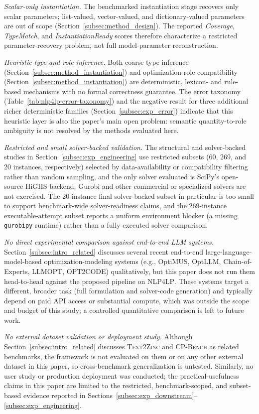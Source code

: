 \documentclass[pdflatex,sn-basic,Numbered]{sn-jnl}
\begin{document}
\emph{Scalar-only instantiation.} The benchmarked instantiation stage recovers only scalar parameters; list-valued, vector-valued, and dictionary-valued parameters are out of scope (Section~\ref{subsec:method_design}). The reported \textit{Coverage}, \textit{TypeMatch}, and \textit{InstantiationReady} scores therefore characterize a restricted parameter-recovery problem, not full model-parameter reconstruction.

\emph{Heuristic type and role inference.} Both coarse type inference (Section~\ref{subsec:method_instantiation}) and optimization-role compatibility (Section~\ref{subsec:method_instantiation}) are deterministic, lexicon- and rule-based mechanisms with no formal correctness guarantee. The error taxonomy (Table~\ref{tab:nlp4lp-error-taxonomy}) and the negative result for three additional richer deterministic families (Section~\ref{subsec:exp_error}) indicate that this heuristic layer is also the paper's main open problem: semantic quantity-to-role ambiguity is not resolved by the methods evaluated here.

\emph{Restricted and small solver-backed validation.} The structural and solver-backed studies in Section~\ref{subsec:exp_engineering} use restricted subsets (60, 269, and 20 instances, respectively) selected by data-availability or compatibility filtering rather than random sampling, and the only solver evaluated is SciPy's open-source HiGHS backend; Gurobi and other commercial or specialized solvers are not exercised. The 20-instance final solver-backed subset in particular is too small to support benchmark-wide solver-readiness claims, and the 269-instance executable-attempt subset reports a uniform environment blocker (a missing \texttt{gurobipy} runtime) rather than a fully executed solver comparison.

\emph{No direct experimental comparison against end-to-end LLM systems.} Section~\ref{subsec:intro_related} discusses several recent end-to-end large-language-model-based optimization-modeling systems (e.g., OptiMUS, OptLLM, Chain-of-Experts, LLMOPT, OPT2CODE) qualitatively, but this paper does not run them head-to-head against the proposed pipeline on \textsc{NLP4LP}. These systems target a different, broader task (full formulation and solver-code generation) and typically depend on paid API access or substantial compute, which was outside the scope and budget of this study; a controlled quantitative comparison is left to future work.

\emph{No external dataset validation or deployment study.} Although Section~\ref{subsec:intro_related} discusses \textsc{Text2Zinc} and \textsc{CP-Bench} as related benchmarks, the framework is not evaluated on them or on any other external dataset in this paper, so cross-benchmark generalization is untested. Similarly, no user study or production deployment was conducted; the practical-usefulness claims in this paper are limited to the restricted, benchmark-scoped, and subset-based evidence reported in Sections~\ref{subsec:exp_downstream}--\ref{subsec:exp_engineering}.
\end{document}
